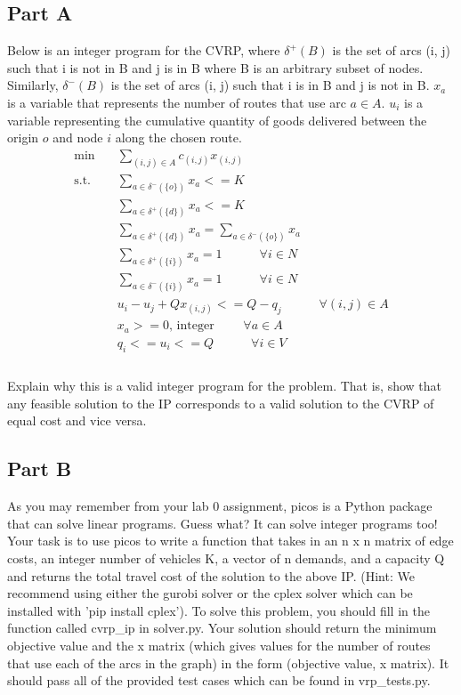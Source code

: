 \documentclass{article}
\begin{document}
\subsection*{Part A}
Below is an integer program for the CVRP, where $\delta^+(B)$ is the set of arcs (i, j) such that i is not in B and j is in B where B is an arbitrary subset of nodes. Similarly, $\delta^-(B)$ is the set of arcs (i, j) such that i is in B and j is not in B. $x_a$ is a variable that represents the number of routes that use arc $a \in A$. $u_i$ is a variable representing the cumulative quantity of goods delivered between the origin $o$ and node $i$ along the chosen route. \\
\[ \begin{aligned}
\min \quad & \sum_{(i,j)\in A}{c_{(i,j)}x_{(i,j)}}\\
\textrm{s.t.} \quad & 
  \sum_{a \in \delta^-(\{o\})}{x_a} <= K \\
  \quad & \sum_{a \in \delta^+(\{d\})}{x_a} <= K \\
  \quad & \sum_{a \in \delta^+(\{d\})}{x_a} = \sum_{a \in \delta^-(\{o\})}{x_a} \\
  \quad & \sum_{a \in \delta^+(\{i\})}{x_a} = 1 \quad\quad\quad \forall i \in N \\
  \quad & \sum_{a \in \delta^-(\{i\})}{x_a} = 1 \quad\quad\quad \forall i \in N \\
  \quad & u_i - u_j + Qx_{(i,j)} <= Q - q_j \quad\quad\quad \forall (i,j) \in A \\
  \quad & x_a >=0 \mbox{, integer } \quad\quad \forall a \in A \\
  \quad & q_i <= u_i <= Q \quad\quad\quad \forall i \in V \\
\end{aligned} \]
\\

Explain why this is a valid integer program for the problem. That is, show that any feasible solution to the IP corresponds to a valid solution to the CVRP of equal cost and vice versa.

\subsection*{Part B}
As you may remember from your lab 0 assignment, picos is a Python package that can solve linear programs. Guess what? It can solve integer programs too! Your task is to use picos to write a function that takes in an n x n matrix of edge costs, an integer number of vehicles K, a vector of n demands, and a capacity Q and returns the total travel cost of the solution to the above IP. (Hint: We recommend using either the gurobi solver or the cplex solver which can be installed with 'pip install cplex'). To solve this problem, you should fill in the function called cvrp\_ip in solver.py. Your solution should return the minimum objective value and the x matrix (which gives values for the number of routes that use each of the arcs in the graph) in the form (objective value, x matrix). It should pass all of the provided test cases which can be found in vrp\_tests.py.
\end{document}
